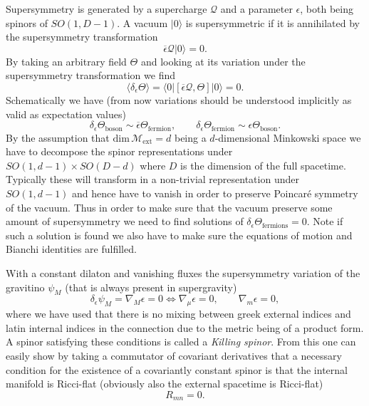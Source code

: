 Supersymmetry is generated by a supercharge $\mathcal{Q}$ and a parameter $\epsilon$, both being spinors of $SO(1,D-1)$. A vacuum $|0\rangle$ is supersymmetric if it is annihilated by the supersymmetry transformation
\begin{equation}
    \overbar{\epsilon}\mathcal{Q}|0\rangle = 0.
\end{equation}
By taking an arbitrary field $\Theta$ and looking at its variation under the supersymmetry transformation we find 
\begin{equation}
    \langle \delta_{\epsilon}\Theta\rangle = \langle 0|\left[\overbar{\epsilon}\mathcal{Q},\Theta\right]|0\rangle = 0.
\end{equation}
Schematically we have (from now variations should be understood implicitly as valid as expectation values)
\begin{equation}
    \delta_\epsilon \Theta_{\text{boson}} \sim \overbar{\epsilon}\Theta_{\text{fermion}},\qquad \delta_\epsilon \Theta_{\text{fermion}}\sim \epsilon\Theta_{\text{boson}}.
\end{equation}
By the assumption that $\text{dim}\,\mathcal{M}{_{\text{ext}}}=d$ being a $d$-dimensional Minkowski space we have to decompose the spinor representations under $SO(1,d-1)\times SO(D-d)$ where $D$ is the dimension of the full spacetime. Typically these will transform in a non-trivial representation under $SO(1,d-1)$ and hence have to vanish in order to preserve Poincaré symmetry of the vacuum. Thus in order to make sure that the vacuum preserve some amount of supersymmetry we need to find solutions of $\delta_\epsilon\Theta_{\text{fermions}}=0$. Note if such a solution is found we also have to make sure the equations of motion and Bianchi identities are fulfilled. 

With a constant dilaton and vanishing fluxes the supersymmetry variation of the gravitino $\psi_M$ (that is always present in supergravity) \cite{Blumenhagen2013}
\begin{equation}
    \delta_\epsilon\psi_M = \nabla_M\epsilon = 0 \Leftrightarrow \nabla_\mu \epsilon = 0,\qquad \nabla_m\epsilon = 0,
\end{equation}
where we have used that there is no mixing between greek external indices and latin internal indices in the connection due to the metric being of a product form. A spinor satisfying these conditions is called a \emph{Killing spinor}. From this one can easily show by taking a commutator of covariant derivatives that a necessary condition for the existence of a covariantly constant spinor is that the internal manifold is Ricci-flat (obviously also the external spacetime is Ricci-flat)
\begin{equation}
    R_{mn} = 0.
\end{equation}

